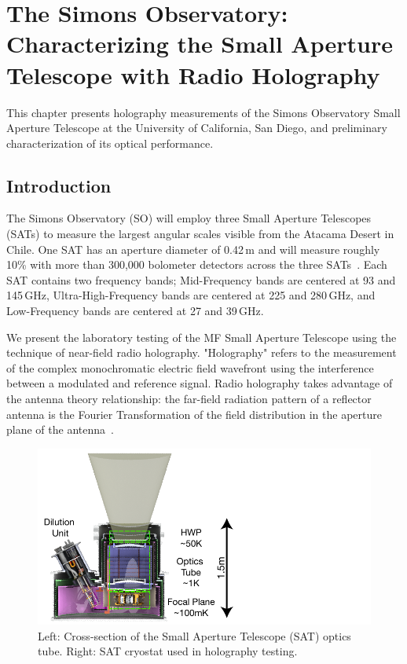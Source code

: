 \chapter{The Simons Observatory: Characterizing the Small Aperture Telescope with Radio Holography}
\label{ch:sat_holo}
This chapter presents holography measurements of the Simons Observatory Small Aperture Telescope at the University of California, San Diego, and preliminary characterization of its optical performance.
\section{Introduction}
The Simons Observatory (SO) will employ three Small Aperture Telescopes (SATs) to measure the largest angular scales visible from the Atacama Desert in Chile.  One SAT has an aperture diameter of 0.42\,m and will measure roughly 10\% with more than 300,000 bolometer detectors across the three SATs~\cite{2020SPIE11445E..7LK}.  Each SAT contains two frequency bands; Mid-Frequency bands are centered at 93 and 145\,GHz, Ultra-High-Frequency bands are centered at 225 and 280\,GHz, and Low-Frequency bands are centered at 27 and 39\,GHz.  

We present the laboratory testing of the MF Small Aperture Telescope using the technique of near-field radio holography.  "Holography" refers to the measurement of the complex monochromatic electric field wavefront using the interference between a modulated and reference signal.  Radio holography takes advantage of the antenna theory relationship: the far-field radiation pattern of a reflector antenna is the Fourier Transformation of the field distribution in the aperture plane of the antenna~\cite{alma_holog}.

\begin{figure}[t!]
    \centering
    \includegraphics[width = .95\textwidth]{Figures/sat_optics.pdf}
    \caption{Left: Cross-section of the Small Aperture Telescope (SAT) optics tube.  Right: SAT cryostat used in holography testing.}
    \label{fig:sat_optics}
\end{figure}

